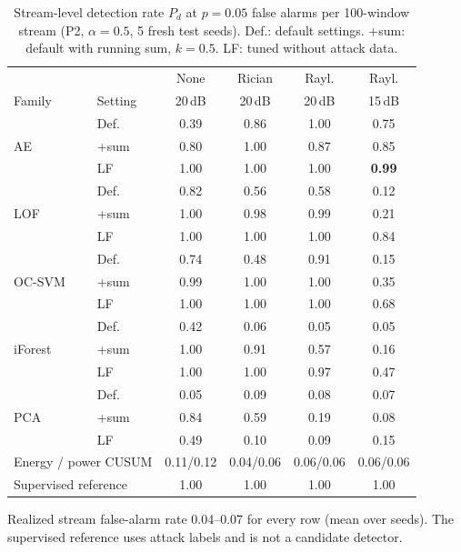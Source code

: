 \documentclass[conference]{IEEEtran}
\begin{document}
\begin{table}[t]
\caption{Stream-level detection rate $P_d$ at $p=0.05$ false alarms per 100-window stream (P2, $\alpha=0.5$, 5 fresh test seeds). Def.: default settings. +sum: default with running sum, $k=0.5$. LF: tuned without attack data.}
\label{tab:stream}
\centering
\footnotesize
\setlength{\tabcolsep}{3.6pt}
\begin{tabular}{llcccc}
\toprule
 & & None & Rician & Rayl. & Rayl. \\
Family & Setting & 20\,dB & 20\,dB & 20\,dB & 15\,dB \\
\midrule
\multirow{3}{*}{AE}      & Def.  & 0.39 & 0.86 & 1.00 & 0.75 \\
                         & +sum  & 0.80 & 1.00 & 0.87 & 0.85 \\
                         & LF    & 1.00 & 1.00 & 1.00 & \textbf{0.99} \\
\midrule
\multirow{3}{*}{LOF}     & Def.  & 0.82 & 0.56 & 0.58 & 0.12 \\
                         & +sum  & 1.00 & 0.98 & 0.99 & 0.21 \\
                         & LF    & 1.00 & 1.00 & 1.00 & 0.84 \\
\midrule
\multirow{3}{*}{OC-SVM}  & Def.  & 0.74 & 0.48 & 0.91 & 0.15 \\
                         & +sum  & 0.99 & 1.00 & 1.00 & 0.35 \\
                         & LF    & 1.00 & 1.00 & 1.00 & 0.68 \\
\midrule
\multirow{3}{*}{iForest} & Def.  & 0.42 & 0.06 & 0.05 & 0.05 \\
                         & +sum  & 1.00 & 0.91 & 0.57 & 0.16 \\
                         & LF    & 1.00 & 1.00 & 0.97 & 0.47 \\
\midrule
\multirow{3}{*}{PCA}     & Def.  & 0.05 & 0.09 & 0.08 & 0.07 \\
                         & +sum  & 0.84 & 0.59 & 0.19 & 0.08 \\
                         & LF    & 0.49 & 0.10 & 0.09 & 0.15 \\
\midrule
\multicolumn{2}{l}{Energy / power CUSUM} & 0.11/0.12 & 0.04/0.06 & 0.06/0.06 & 0.06/0.06 \\
\multicolumn{2}{l}{Supervised reference} & 1.00 & 1.00 & 1.00 & 1.00 \\
\bottomrule
\end{tabular}

\smallskip
\parbox{\columnwidth}{\scriptsize Realized stream false-alarm rate 0.04--0.07 for every row (mean over seeds). The supervised reference uses attack labels and is not a candidate detector.}
\end{table}
\end{document}
